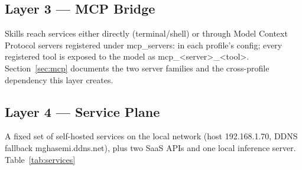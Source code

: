 \documentclass[10pt]{article}
\newcommand{\mono}[1]{{\ttfamily\small #1}}
\begin{document}
\subsection*{Layer 3 --- MCP Bridge}
Skills reach services either directly (terminal/shell) or through Model Context Protocol servers
registered under \mono{mcp\_servers:} in each profile's config; every registered tool is exposed
to the model as \mono{mcp\_<server>_<tool>}. Section~\ref{sec:mcp} documents the two server
families and the cross-profile dependency this layer creates.

\subsection*{Layer 4 --- Service Plane}
A fixed set of self-hosted services on the local network (host \mono{192.168.1.70}, DDNS fallback
\mono{mghasemi.ddns.net}), plus two SaaS APIs and one local inference server. Table~\ref{tab:services}
\end{document}
